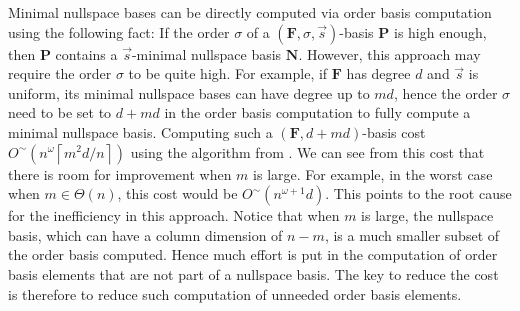 Minimal nullspace bases can be directly computed via order basis computation
using the following fact: If the order $\sigma$ of a $\left(\mathbf{F},\sigma,\vec{s}\right)$-basis
$\mathbf{P}$ is high enough, then $\mathbf{P}$ contains a $\vec{s}$-minimal
nullspace basis $\mathbf{N}$. However, this approach may require
the order $\sigma$ to be quite high. For example, if $\mathbf{F}$
has degree $d$ and $\vec{s}$ is uniform, its minimal nullspace bases
can have degree up to $md$, hence the order $\sigma$ need to be
set to $d+md$ in the order basis computation to fully compute a minimal
nullspace basis. Computing such a $\left(\mathbf{F},d+md\right)$-basis
cost $O^{\sim}\left(n^{\omega}\left\lceil m^{2}d/n\right\rceil \right)$
using the algorithm from \citep{za2009}. We can see from this cost
that there is room for improvement when $m$ is large. For example,
in the worst case when $m\in\Theta\left(n\right)$, this cost would
be $O^{\sim}\left(n^{\omega+1}d\right)$. This points to the root
cause for the inefficiency in this approach. Notice that when $m$
is large, the nullspace basis, which can have a column dimension of
$n-m$, is a much smaller subset of the order basis computed. Hence
much effort is put in the computation of order basis elements that
are not part of a nullspace basis. The key to reduce the cost is therefore
to reduce such computation of unneeded order basis elements.
